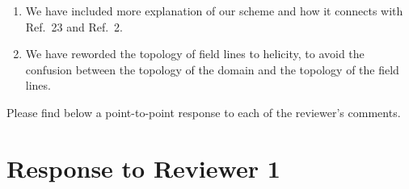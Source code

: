 \documentclass[12pt]{article}
\theoremstyle{definition}
\begin{document}
\begin{enumerate}
\begin{enumerate}
    \end{enumerate}
    \item We have included more explanation of our scheme and how it connects with Ref.~23 and Ref.~2. 
    \item We have reworded the topology of field lines to helicity, to avoid the confusion between the topology of the domain and the topology of the field lines. 
\end{enumerate}

Please find below a point-to-point response to each of the reviewer's comments.

\section{Response to Reviewer 1}
\end{document}
